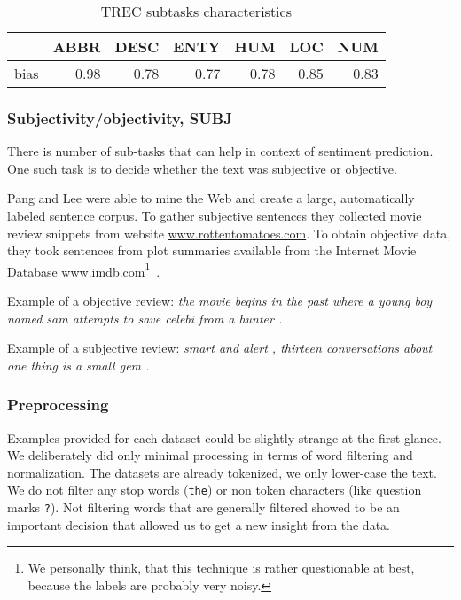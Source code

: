     \begin{table}[h]
    \begin{center}
    
    \begin{tabular}{lrrrrrr}
    \toprule
    {} &  ABBR &  DESC &  ENTY &   HUM &   LOC &   NUM \\
    \midrule
    bias &  0.98 &  0.78 &  0.77 &  0.78 &  0.85 &  0.83 \\
    \bottomrule
    \end{tabular}
    
    \caption[TREC subtasks characteristics]{TREC subtasks characteristics}
    \label{tab:trec:stats}
    \end{center}
    \end{table}

    \subsubsection{Subjectivity/objectivity, SUBJ}
    
    There is number of sub-tasks that can help in context of sentiment prediction.
    One such task is to decide whether the text was subjective or objective.
        
    Pang and Lee were able to mine the Web and create a large, automatically labeled sentence corpus. 
    To gather subjective sentences they collected movie review snippets from website  \url{www.rottentomatoes.com}.
    To obtain objective data, they took sentences from plot summaries available from the Internet Movie Database \url{www.imdb.com}\footnote{We personally think, that this technique is rather questionable at best, because the labels are probably very noisy.}~\cite{pang2004sentimental}.
    
    Example of a objective review:
    \emph{the movie begins in the past where a young boy named sam attempts to save celebi from a hunter .}

    Example of a subjective review:
    \emph{smart and alert , thirteen conversations about one thing is a small gem .}
    

    \subsubsection{Preprocessing} \label{sec:preprocessing}
    
    Examples provided for each dataset could be slightly strange at the first glance.
    We deliberately did only minimal processing in terms of word filtering and normalization.
    The datasets are already tokenized, we only lower-case the text.
    We do not filter any stop words (\texttt{the}) or non token characters (like question marks \texttt{?}). 
    Not filtering words that are generally filtered showed to be an important decision that allowed us to get a new insight from the data.
    
